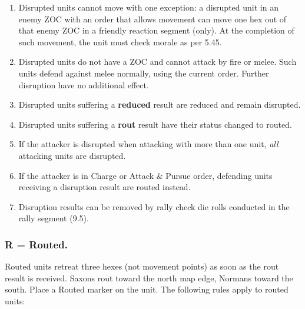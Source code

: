 \begin{enumerate}
  \item Disrupted units cannot move with one exception: a disrupted unit in an enemy ZOC with an order that allows movement can move one hex out of that enemy ZOC in a friendly reaction segment (only). At the completion of such movement, the unit must check morale as per 5.45.
  \item Disrupted units do not have a ZOC and cannot attack by fire or melee. Such units defend against melee normally, using the current order. Further disruption have no additional effect.
  \item Disrupted units suffering a \textbf{reduced} result are reduced and remain disrupted.
  \item Disrupted units suffering a \textbf{rout} result have their status changed to routed.
  \item If the attacker is disrupted when attacking with more than one unit, \textit{all} attacking units are disrupted.
    \item If the attacker is in Charge or Attack \& Pursue order, defending units receiving a disruption result are routed instead.
  \item Disruption results can be removed by rally check die rolls conducted in the rally segment (9.5).
\end{enumerate}

\subsubsection[Routed]{R = Routed.} Routed units retreat three hexes (not movement points) as soon as the rout result is received. Saxons rout toward the north map edge, Normans toward the south. Place a Routed marker on the unit. The following rules apply to routed units:

